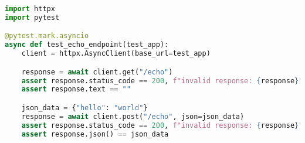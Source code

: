 \documentclass[times,numbers=noenddot]{itmo-student-thesis}
\begin{document}
\begin{lstlisting}[float=!h,caption={Тест первичной реализации},label={lst4},language=python]
import httpx
import pytest

@pytest.mark.asyncio
async def test_echo_endpoint(test_app):
    client = httpx.AsyncClient(base_url=test_app)

    response = await client.get("/echo")
    assert response.status_code == 200, f"invalid response: {response}"
    assert response.text == ""

    json_data = {"hello": "world"}
    response = await client.post("/echo", json=json_data)
    assert response.status_code == 200, f"invalid response: {response}"
    assert response.json() == json_data
\end{lstlisting}
\end{document}

